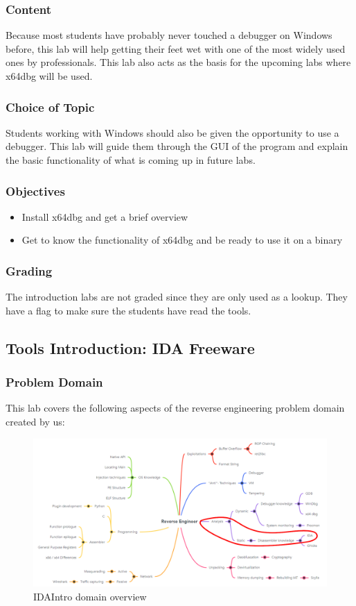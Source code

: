 \subsubsection*{Content}
Because most students have probably never touched a debugger on Windows before, this lab will help getting their feet wet with one of the most widely used ones by professionals.
This lab also acts as the basis for the upcoming labs where x64dbg will be used.
\subsubsection*{Choice of Topic}
Students working with Windows should also be given the opportunity to use a debugger. This lab will guide them through the GUI of the program and explain the basic functionality of what is coming up in future labs.
\subsubsection*{Objectives}
\begin{itemize}
    \item Install x64dbg and get a brief overview
    \item Get to know the functionality of x64dbg and be ready to use it on a binary
\end{itemize}
\subsubsection*{Grading}
The introduction labs are not graded since they are only used as a lookup. They have a flag to make sure the students have read the tools.
\pagebreak

\subsection{Tools Introduction: IDA Freeware}
\subsubsection*{Problem Domain}
This lab covers the following aspects of the reverse engineering problem domain created by us:
\vspace{-2ex}
\begin{figure}[H]
    \includegraphics[width=\textwidth]{resources/IDAIntro-overview-light.png}
    \caption{IDAIntro domain overview}
    \label{fig:IDAIntro-overview}
\end{figure}
